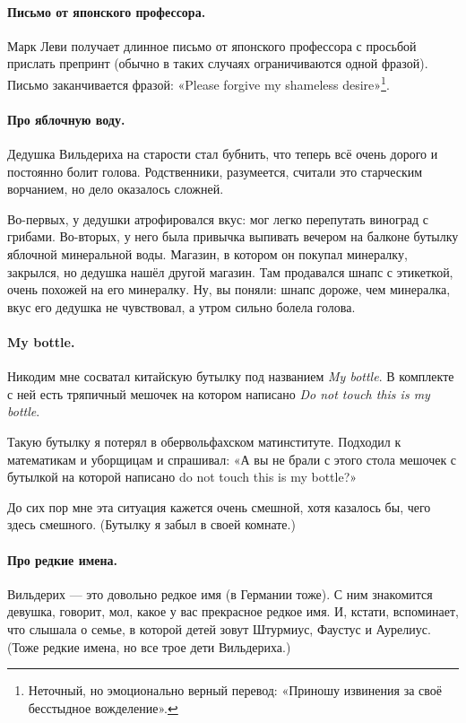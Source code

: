 \documentclass{book}
\begin{document}
\paragraph{Письмо от японского профессора.}
Марк Леви получает длинное письмо от японского профессора с просьбой прислать препринт (обычно в таких случаях ограничиваются одной фразой).
Письмо заканчивается фразой: «Please forgive my shameless desire»\footnote{Неточный, но эмоционально верный перевод: «Приношу извинения за своё бесстыдное вожделение».}.

\paragraph{Про яблочную воду.}
Дедушка Вильдериха на старости стал бубнить, что теперь всё очень дорого и постоянно болит голова.
Родственники, разумеется, считали это старческим ворчанием, но дело оказалось сложней.

Во-первых, у дедушки атрофировался вкус: мог легко перепутать виноград с грибами.
Во-вторых, у него была привычка выпивать вечером на балконе бутылку яблочной минеральной воды.
Магазин, в котором он покупал минералку, закрылся, но дедушка нашёл другой магазин.
Там продавался шнапс с этикеткой, очень похожей на его минералку.
Ну, вы поняли: шнапс дороже, чем минералка, вкус его дедушка не чувствовал, а утром сильно болела голова.

\paragraph{My bottle.}
Никодим мне сосватал китайскую бутылку под названием \textit{My bottle}.
В комплекте с ней есть тряпичный мешочек на котором написано \textit{Do not touch this is my bottle}.

Такую бутылку я потерял в обервольфахском матинституте.
Подходил к математикам и уборщицам и спрашивал: «А вы не брали с этого стола мешочек с бутылкой на которой написано do not touch this is my bottle?»

До сих пор мне эта ситуация кажется очень смешной, хотя казалось бы, чего здесь смешного.
(Бутылку я забыл в своей комнате.)

\paragraph{Про редкие имена.}
Вильдерих --- это довольно редкое имя (в Германии тоже).
С ним знакомится девушка, говорит, мол, какое у вас прекрасное редкое имя.
И, кстати, вспоминает, что слышала о семье, в которой детей зовут Штурмиус, Фаустус и Аурелиус.
(Тоже редкие имена, но все трое дети Вильдериха.)
\end{document}
